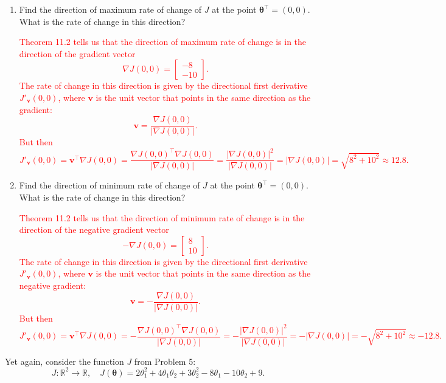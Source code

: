 \documentclass[12pt,reqno]{amsart}
\begin{document}
\begin{enumerate}
\item Find the direction of maximum rate of change of $J$ at the point $\boldsymbol{\theta}^\intercal = (0,0)$. What is the rate of change in this direction?

\bigskip
\textcolor{red}{Theorem 11.2 tells us that the direction of maximum rate of change is in the direction of the gradient vector
	\[\nabla J(0,0) = \begin{bmatrix}
	-8 \\ -10
	\end{bmatrix}.
	\]
The rate of change in this direction is given by the directional first derivative $J'_\mathbf{v}(0,0)$, where $\mathbf{v}$ is the unit vector that points in the same direction as the gradient:
	\[\mathbf{v} = \frac{\nabla J(0,0)}{|\nabla J(0,0)|}.
	\]
But then
	\[J'_\mathbf{v}(0,0) = \mathbf{v}^\intercal \nabla J(0,0) = \frac{\nabla J(0,0)^\intercal \nabla J(0,0)}{|\nabla J(0,0)|} = \frac{|\nabla J(0,0)|^2}{|\nabla J(0,0)|} = |\nabla J(0,0)| = \sqrt{8^2 + 10^2} \approx 12.8.
	\]}
\bigskip

\item Find the direction of minimum rate of change of $J$ at the point $\boldsymbol{\theta}^\intercal = (0,0)$. What is the rate of change in this direction?

\bigskip
\textcolor{red}{Theorem 11.2 tells us that the direction of minimum rate of change is in the direction of the negative gradient vector
	\[-\nabla J(0,0) = \begin{bmatrix}
	8 \\ 10
	\end{bmatrix}.
	\]
The rate of change in this direction is given by the directional first derivative $J'_\mathbf{v}(0,0)$, where $\mathbf{v}$ is the unit vector that points in the same direction as the negative gradient:
	\[\mathbf{v} = -\frac{\nabla J(0,0)}{|\nabla J(0,0)|}.
	\]
But then
	\[J'_\mathbf{v}(0,0) = \mathbf{v}^\intercal \nabla J(0,0) = -\frac{\nabla J(0,0)^\intercal \nabla J(0,0)}{|\nabla J(0,0)|} =- \frac{|\nabla J(0,0)|^2}{|\nabla J(0,0)|} = -|\nabla J(0,0)| = -\sqrt{8^2 + 10^2} \approx -12.8.
	\]}
\bigskip
\end{enumerate}







\prob Yet again, consider the function $J$ from Problem 5:
	\[J: \mathbb{R}^2 \to \mathbb{R}, \quad J(\boldsymbol{\theta}) = 2\theta_1^2 + 4\theta_1\theta_2 + 3\theta_2^2 -8\theta_1 - 10\theta_2 + 9.
	\]
\end{document}

